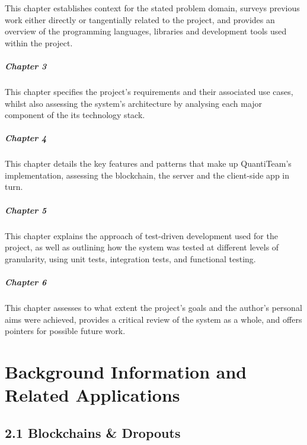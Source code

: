 This chapter establishes context for the stated problem domain, surveys
previous work either directly or tangentially related to the project,
and provides an overview of the programming languages, libraries and
development tools used within the project.

\paragraph{Chapter 3}\label{chapter-3}

This chapter specifies the project's requirements and their associated
use cases, whilst also assessing the system's architecture by analysing
each major component of the its technology stack.

\paragraph{Chapter 4}\label{chapter-4}

This chapter details the key features and patterns that make up
QuantiTeam's implementation, assessing the blockchain, the server and
the client-side app in turn.

\paragraph{Chapter 5}\label{chapter-5}

This chapter explains the approach of test-driven development used for
the project, as well as outlining how the system was tested at different
levels of granularity, using unit tests, integration tests, and
functional testing.

\paragraph{Chapter 6}\label{chapter-6}

This chapter assesses to what extent the project's goals and the
author's personal aims were achieved, provides a critical review of the
system as a whole, and offers pointers for possible future work.

\clearpage

\chapter{Background Information and Related
Applications}

\section{2.1 Blockchains \& Dropouts}\label{blockchains-dropouts}

